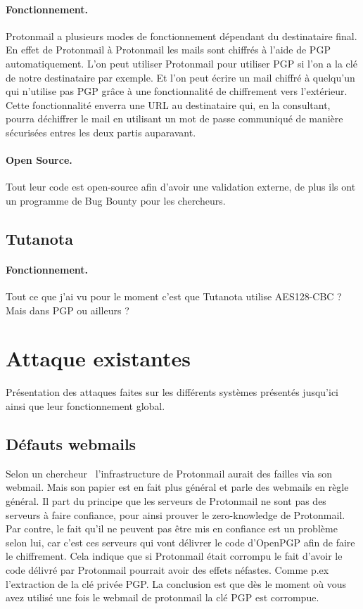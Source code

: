 \paragraph*{Fonctionnement.}
Protonmail a plusieurs modes de fonctionnement dépendant du destinataire final. En effet de Protonmail à Protonmail les mails sont chiffrés à l'aide de PGP automatiquement. L'on peut utiliser Protonmail pour utiliser PGP si l'on a la clé de notre destinataire par exemple. Et l'on peut écrire un mail chiffré à quelqu'un qui n'utilise pas PGP grâce à une fonctionnalité de chiffrement vers l'extérieur.
Cette fonctionnalité enverra une URL au destinataire qui, en la consultant, pourra déchiffrer le mail en utilisant un mot de passe communiqué de manière sécurisées entres les deux partis auparavant.
\paragraph*{Open Source.}
Tout leur code est open-source afin d'avoir une validation externe, de plus ils ont un programme de Bug Bounty pour les chercheurs.
\subsection{Tutanota}
\paragraph*{Fonctionnement.}
Tout ce que j'ai vu pour le moment c'est que Tutanota utilise AES128-CBC ? Mais dans PGP ou ailleurs ?
\section{Attaque existantes}
Présentation des attaques faites sur les différents systèmes présentés jusqu'ici ainsi que leur fonctionnement global.
\subsection{Défauts webmails}
Selon un chercheur~\cite{DBLP:journals/iacr/Kobeissi18a} l'infrastructure de Protonmail aurait des failles via son webmail. Mais son papier est en fait plus général et parle des webmails en règle général.
Il part du principe que les serveurs de Protonmail ne sont pas des serveurs à faire confiance, pour ainsi prouver le zero-knowledge de Protonmail. Par contre, le fait qu'il ne peuvent pas être mis en confiance est un problème selon lui, car c'est ces serveurs qui vont délivrer le code d'OpenPGP afin de faire le chiffrement. 
Cela indique que si Protonmail était corrompu le fait d'avoir le code délivré par Protonmail pourrait avoir des effets néfastes. Comme p.ex l'extraction de la clé privée PGP. La conclusion est que dès le moment où vous avez utilisé une fois le webmail de protonmail la clé PGP est corrompue.
